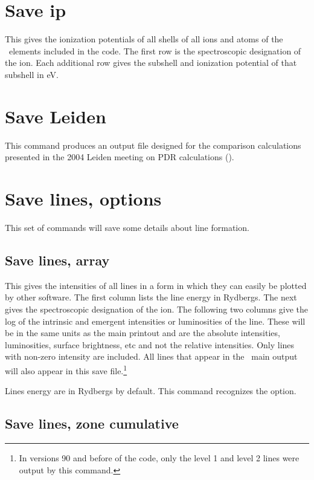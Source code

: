 \section{Save ip}

This gives the ionization potentials of all shells of all ions and atoms
of the \LIMELM\ elements included in the code.  The first row is the spectroscopic
designation of the ion.  Each additional row gives the subshell and
ionization potential of that subshell in eV.

\section{Save Leiden}

This command produces an output file designed for the comparison
calculations presented in the 2004 Leiden meeting on PDR calculations
(\citealp{Roellig2007}).

\section{Save lines, options}

This set of commands will save some details about line formation.

\subsection{Save lines, array}

This gives the intensities of all lines in a form in which they can easily
be plotted by other software.  The first column lists the line energy in
Rydbergs.  The next gives the spectroscopic designation of the ion.  The
following two columns give the log of the intrinsic and emergent intensities
or luminosities of the line.  These will be in the same units as the main printout
and are the absolute intensities, luminosities, surface brightness, etc and not the 
relative intensities.
Only lines with non-zero intensity are included.
All lines that appear in the \Cloudy\ main output will also appear in
this save file.\footnote{In versions 90 and before of the code, only the level 1 and level
2 lines were output by this command.}

Lines energy are in Rydbergs by default.  This command recognizes the
 option.

\subsection{Save lines, zone cumulative}

